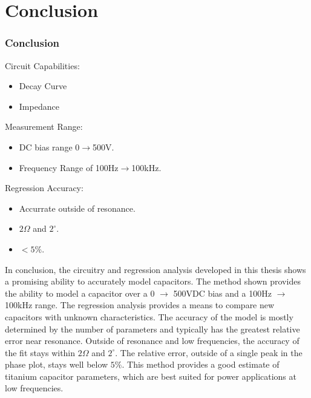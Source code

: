 \section {Conclusion}
\label{sec:conclusion}

\ifisPPT
\begin{frame}
    \frametitle{Conclusion}

Circuit Capabilities:
\begin{itemize}
    \item Decay Curve
    \item Impedance
\end{itemize}

Measurement Range:
\begin{itemize}
    \item DC bias range 0$\rightarrow$500V.
    \item Frequency Range of 100Hz$\rightarrow$100kHz.
\end{itemize}

Regression Accuracy:
\begin{itemize}
    \item Accurrate outside of resonance.
    \item $2 \Omega$ and $2^{\circ}$.
    \item $<5\%$.
\end{itemize}
\end{frame}
\else
In conclusion, the circuitry and regression analysis developed in this thesis shows a promising ability to accurately model capacitors. The method shown provides the ability to model a capacitor over a 0 $\rightarrow$ 500VDC bias and a 100Hz $\rightarrow$ 100kHz range. The regression analysis provides a means to compare new capacitors with unknown characteristics. The accuracy of the model is mostly determined by the number of parameters and typically has the greatest relative error near resonance. Outside of resonance and low frequencies, the accuracy of the fit stays within $2 \Omega$ and $2^{\circ}$. The relative error, outside of a single peak in the phase plot, stays well below $5\%$. This method provides a good estimate of titanium capacitor parameters, which are best suited for power applications  at low frequencies.
\fi

